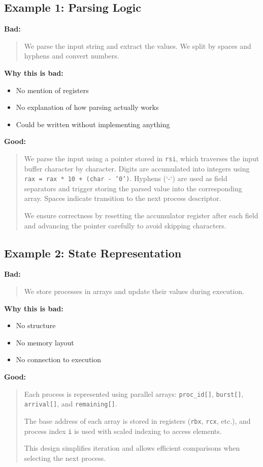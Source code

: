 \documentclass[a4paper,12pt]{article}
\begin{document}
\subsection*{Example 1: Parsing Logic}

\textbf{Bad:}
\begin{quote}
We parse the input string and extract the values. We split by spaces and hyphens and convert numbers.
\end{quote}

\textbf{Why this is bad:}
\begin{itemize}
\item No mention of registers
\item No explanation of how parsing actually works
\item Could be written without implementing anything
\end{itemize}

\textbf{Good:}
\begin{quote}
We parse the input using a pointer stored in \texttt{rsi}, which traverses the input buffer character by character. 
Digits are accumulated into integers using \texttt{rax = rax * 10 + (char - '0')}. 
Hyphens (`-`) are used as field separators and trigger storing the parsed value into the corresponding array. 
Spaces indicate transition to the next process descriptor. 

We ensure correctness by resetting the accumulator register after each field and advancing the pointer carefully to avoid skipping characters.
\end{quote}

\subsection*{Example 2: State Representation}

\textbf{Bad:}
\begin{quote}
We store processes in arrays and update their values during execution.
\end{quote}

\textbf{Why this is bad:}
\begin{itemize}
\item No structure
\item No memory layout
\item No connection to execution
\end{itemize}

\textbf{Good:}
\begin{quote}
Each process is represented using parallel arrays:
\texttt{proc\_id[]}, \texttt{burst[]}, \texttt{arrival[]}, and \texttt{remaining[]}. 

The base address of each array is stored in registers (\texttt{rbx}, \texttt{rcx}, etc.), and process index \texttt{i} is used with scaled indexing to access elements. 

This design simplifies iteration and allows efficient comparisons when selecting the next process. 

\end{quote}
\end{document}
